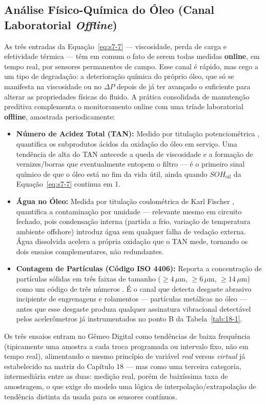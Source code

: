 \documentclass[12pt,a4paper]{article}
\numberwithin{equation}{section}
\numberwithin{table}{section}
\numberwithin{figure}{section}
\begin{document}
	\subsection{\textbf{Análise Físico-Química do Óleo (Canal Laboratorial \textit{Offline})}}
	As três entradas da Equação~\eqref{eq:s7-7} — viscosidade, perda de carga e efetividade térmica — têm em comum o fato de serem todas medidas \textbf{online}, em tempo real, por sensores permanentes de campo. Esse canal é rápido, mas cego a um tipo de degradação: a deterioração química do próprio óleo, que só se manifesta na viscosidade ou no $\Delta P$ depois de já ter avançado o suficiente para alterar as propriedades físicas do fluido. A prática consolidada de manutenção preditiva \cite{mobley} complementa o monitoramento online com uma tríade laboratorial \textbf{offline}, amostrada periodicamente:
	\begin{itemize}
		\item \textbf{Número de Acidez Total (TAN):} Medido por titulação potenciométrica \cite{astmd664}, quantifica os subprodutos ácidos da oxidação do óleo em serviço. Uma tendência de alta do TAN antecede a queda de viscosidade e a formação de vernizes/borras que eventualmente entopem o filtro — é o primeiro sinal químico de que o óleo está no fim da vida útil, ainda quando $SOH_{\text{oil}}$ da Equação~\eqref{eq:s7-7} continua em 1.
		\item \textbf{Água no Óleo:} Medida por titulação coulométrica de Karl Fischer \cite{astmd6304}, quantifica a contaminação por umidade — relevante mesmo em circuito fechado, pois condensação interna (partida a frio, variação de temperatura ambiente offshore) introduz água sem qualquer falha de vedação externa. Água dissolvida acelera a própria oxidação que o TAN mede, tornando os dois ensaios complementares, não redundantes.
		\item \textbf{Contagem de Partículas (Código ISO 4406):} Reporta a concentração de partículas sólidas em três faixas de tamanho ($\ge 4\,\mu\text{m}$, $\ge 6\,\mu\text{m}$, $\ge 14\,\mu\text{m}$) como um código de três números \cite{iso4406}. É o canal que detecta desgaste abrasivo incipiente de engrenagens e rolamentos — partículas metálicas no óleo — antes que esse desgaste produza qualquer assinatura vibracional detectável pelos acelerômetros já instrumentados no ponto B da Tabela~\ref{tab:18-1}.
	\end{itemize}
	Os três ensaios entram no Gêmeo Digital como tendências de baixa frequência (tipicamente uma amostra a cada troca programada ou intervalo fixo, não em tempo real), alimentando o mesmo princípio de variável \textit{real} versus \textit{virtual} já estabelecido na matriz do Capítulo 18 — mas como uma terceira categoria, intermediária entre as duas: medição real, porém de baixíssima taxa de amostragem, o que exige do modelo uma lógica de interpolação/extrapolação de tendência distinta da usada para os sensores contínuos.
\end{document}
